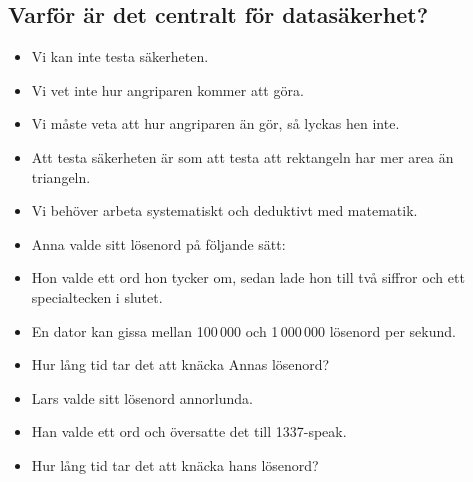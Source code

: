 \subsection{Varför är det centralt för datasäkerhet?}

\begin{frame}
  \begin{remark}
    \begin{itemize}
      \item Vi kan inte testa säkerheten.
      \item Vi vet inte hur angriparen kommer att göra.
      \item Vi måste veta att hur angriparen än gör, så lyckas hen inte.
    \end{itemize}
  \end{remark}

  \pause

  \begin{example}
    \begin{itemize}
      \item Att testa säkerheten är som att testa att rektangeln har mer area 
        än triangeln.
    \end{itemize}
  \end{example}
\end{frame}

\begin{frame}
  \begin{solution}
    \begin{itemize}
      \item Vi behöver arbeta systematiskt och deduktivt med matematik.
    \end{itemize}
  \end{solution}
\end{frame}

\begin{frame}
  \begin{exercise}
    \begin{itemize}
      \item Anna valde sitt lösenord på följande sätt:
      \item Hon valde ett ord hon tycker om, sedan lade hon till två siffror 
        och ett specialtecken i slutet.
      \item En dator kan gissa mellan 100\,000 och 1\,000\,000 lösenord per 
        sekund.
      \item Hur lång tid tar det att knäcka Annas lösenord?
    \end{itemize}
  \end{exercise}

  \pause

  \begin{exercise}
    \begin{itemize}
      \item Lars valde sitt lösenord annorlunda.
      \item Han valde ett ord och översatte det till 1337-speak.
      \item Hur lång tid tar det att knäcka hans lösenord?
    \end{itemize}
  \end{exercise}
\end{frame}

